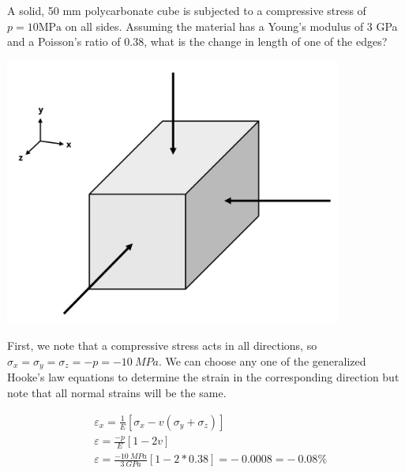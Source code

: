 \documentclass[
  letterpaper,
  DIV=11,
  numbers=noendperiod]{scrreprt}
\theoremstyle{definition}
\theoremstyle{remark}
\begin{document}
\begin{tcolorbox}[enhanced jigsaw, leftrule=.75mm, colbacktitle=quarto-callout-tip-color!10!white, breakable, opacityback=0, colback=white, titlerule=0mm, toprule=.15mm, colframe=quarto-callout-tip-color-frame, coltitle=black, title={Example 4.5}, toptitle=1mm, bottomrule=.15mm, rightrule=.15mm, left=2mm, arc=.35mm, opacitybacktitle=0.6, bottomtitle=1mm]

A solid, 50 mm polycarbonate cube is subjected to a compressive stress
of \(p=10 \mathrm{MPa}\) on all sides. Assuming the material has a
Young's modulus of 3 GPa and a Poisson's ratio of 0.38, what is the
change in length of one of the edges?

\begin{center}
\includegraphics[width=4.36458in,height=\textheight]{images/CH4 PNGs/example 4.5.png}
\end{center}

\begin{tcolorbox}[enhanced jigsaw, leftrule=.75mm, colbacktitle=quarto-callout-tip-color!10!white, breakable, opacityback=0, colback=white, titlerule=0mm, toprule=.15mm, colframe=quarto-callout-tip-color-frame, coltitle=black, title={Solution}, toptitle=1mm, bottomrule=.15mm, rightrule=.15mm, left=2mm, arc=.35mm, opacitybacktitle=0.6, bottomtitle=1mm]

First, we note that a compressive stress acts in all directions, so
\(\sigma_x=\sigma_y=\sigma_z=-p=-10{~MPa}\). We can choose any one of
the generalized Hooke's law equations to determine the strain in the
corresponding direction but note that all normal strains will be the
same.

\[
\begin{aligned}
& \varepsilon_x=\frac{1}{E}\left[\sigma_x-v\left(\sigma_y+\sigma_z\right)\right] \\
& \varepsilon=\frac{-p}{E}[1-2 v] \\
& \varepsilon=\frac{-10 {~MPa}}{3{~GPa}}[1-2*0.38]=-~0.0008=-~0.08 \%
\end{aligned}
\]


\end{tcolorbox}
\end{tcolorbox}
\end{document}
